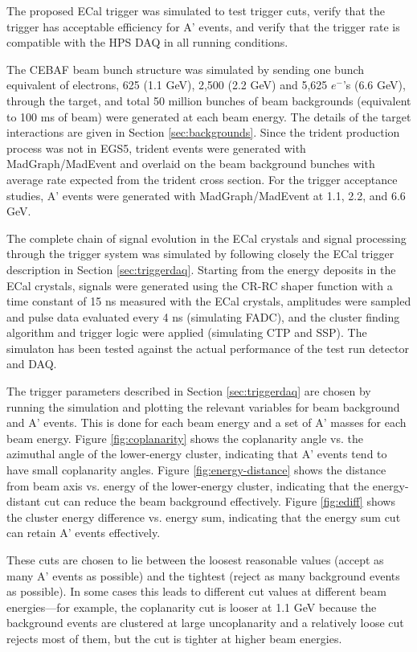 The proposed ECal trigger was simulated to test trigger cuts, verify
that the trigger has acceptable efficiency for A' events, and verify 
that the trigger rate is compatible with the HPS DAQ in all running conditions. 

The CEBAF beam bunch structure was simulated by sending one bunch 
equivalent of electrons, 
625 (1.1 GeV), 2,500 (2.2 GeV) and 5,625 $e^-$'s (6.6 GeV), through 
the target, and total 50 million bunches of beam backgrounds 
(equivalent to 100 ms of beam) were 
generated at each beam energy. The details of the target interactions are given in Section \ref{sec:backgrounds}.
Since the trident production process 
was not in EGS5, trident events were generated with MadGraph/MadEvent 
and overlaid on the beam background bunches with average rate 
expected from the trident cross section.
For the trigger acceptance studies, A' events were generated with 
MadGraph/MadEvent at 1.1, 2.2, and 6.6 GeV.

The complete chain of signal evolution in the ECal crystals and 
signal processing through the trigger system was simulated
by following closely the ECal trigger description in Section \ref{sec:triggerdaq}. 
Starting from the energy deposits in the ECal crystals, signals were 
generated using the CR-RC shaper function with a time constant of 15 ns
measured with the ECal crystals, amplitudes were sampled and pulse data 
evaluated every 4 ns (simulating FADC), and the cluster 
finding algorithm and trigger logic were applied (simulating CTP and SSP). 
The simulaton has been tested against the actual performance of the test run detector and DAQ.

The trigger parameters described in Section \ref{sec:triggerdaq} are 
chosen by running the simulation and plotting the relevant variables 
for beam background and A' events. This is done for each beam energy 
and a set of A' masses for each beam energy. 
Figure \ref{fig:coplanarity} shows the coplanarity angle vs. the azimuthal 
angle of the lower-energy cluster, indicating that A' events 
tend to have small coplanarity angles. Figure \ref{fig:energy-distance} shows
the distance from beam axis vs. energy of the lower-energy cluster,
indicating that the energy-distant cut can reduce the beam background effectively.
Figure \ref{fig:ediff} shows the cluster energy difference vs. energy sum,
indicating that the energy sum cut can retain A' events effectively.       


These cuts are chosen to lie between the loosest reasonable values (accept as many A' events as possible) and the tightest (reject as many background events as possible). In some cases this leads to different cut values at different beam energies---for example, the coplanarity cut is looser at 1.1 GeV because the background events are clustered at large uncoplanarity and a relatively loose cut rejects most of them, but the cut is tighter at higher beam energies.

